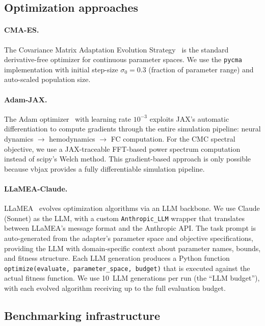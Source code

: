 \documentclass[11pt,a4paper]{article}
\begin{document}
\subsection{Optimization approaches}

\paragraph{CMA-ES.}
The Covariance Matrix Adaptation Evolution Strategy~\citep{Hansen2006} is the standard derivative-free optimizer for continuous parameter spaces.
We use the \texttt{pycma} implementation with initial step-size $\sigma_0 = 0.3$ (fraction of parameter range) and auto-scaled population size.

\paragraph{Adam-JAX.}
The Adam optimizer~\citep{Kingma2015} with learning rate $10^{-3}$ exploits JAX's automatic differentiation to compute gradients through the entire simulation pipeline: neural dynamics $\to$ hemodynamics $\to$ FC computation.
For the CMC spectral objective, we use a JAX-traceable FFT-based power spectrum computation instead of scipy's Welch method.
This gradient-based approach is only possible because vbjax provides a fully differentiable simulation pipeline.

\paragraph{LLaMEA-Claude.}
LLaMEA~\citep{vanStein2025} evolves optimization algorithms via an LLM backbone.
We use Claude (Sonnet) as the LLM, with a custom \texttt{Anthropic\_LLM} wrapper that translates between LLaMEA's message format and the Anthropic API.
The task prompt is auto-generated from the adapter's parameter space and objective specifications, providing the LLM with domain-specific context about parameter names, bounds, and fitness structure.
Each LLM generation produces a Python function \texttt{optimize(evaluate, parameter\_space, budget)} that is executed against the actual fitness function.
We use 10~LLM generations per run (the ``LLM budget''), with each evolved algorithm receiving up to the full evaluation budget.

\subsection{Benchmarking infrastructure}
\end{document}
